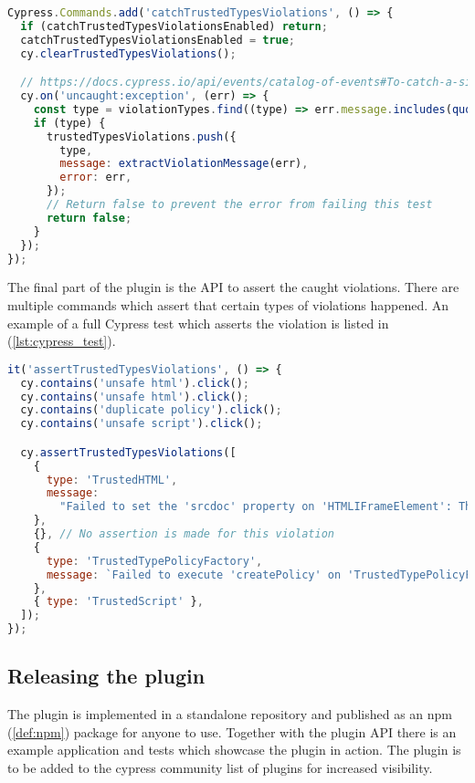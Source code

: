 \bigskip
\begin{lstlisting}[language=JavaScript, caption=Custom command to catch Trusted Types violations]
Cypress.Commands.add('catchTrustedTypesViolations', () => {
  if (catchTrustedTypesViolationsEnabled) return;
  catchTrustedTypesViolationsEnabled = true;
  cy.clearTrustedTypesViolations();

  // https://docs.cypress.io/api/events/catalog-of-events#To-catch-a-single-uncaught-exception
  cy.on('uncaught:exception', (err) => {
    const type = violationTypes.find((type) => err.message.includes(quote(type)));
    if (type) {
      trustedTypesViolations.push({
        type,
        message: extractViolationMessage(err),
        error: err,
      });
      // Return false to prevent the error from failing this test
      return false;
    }
  });
});
\end{lstlisting}

The final part of the plugin is the API to assert the caught violations. There are multiple commands
which assert that certain types of violations happened. An example of a full Cypress test which
asserts the violation is listed in (\ref{lst:cypress_test}).

\bigskip
\begin{lstlisting}[language=JavaScript, caption=Example Trusted Types violation test, label={lst:cypress_test}]
it('assertTrustedTypesViolations', () => {
  cy.contains('unsafe html').click();
  cy.contains('unsafe html').click();
  cy.contains('duplicate policy').click();
  cy.contains('unsafe script').click();

  cy.assertTrustedTypesViolations([
    {
      type: 'TrustedHTML',
      message:
        "Failed to set the 'srcdoc' property on 'HTMLIFrameElement': This document requires 'TrustedHTML' assignment.",
    },
    {}, // No assertion is made for this violation
    {
      type: 'TrustedTypePolicyFactory',
      message: `Failed to execute 'createPolicy' on 'TrustedTypePolicyFactory': Policy with name "my-policy" already exists.`,
    },
    { type: 'TrustedScript' },
  ]);
});
\end{lstlisting}

\subsection{Releasing the plugin}

The plugin is implemented in a standalone repository \cite{cypress-trusted-types:github} and
published as an npm (\ref{def:npm}) package \cite{cypress-trusted-types:npm} for anyone to use.
Together with the plugin API there is an example application and tests which showcase the plugin in
action. The plugin is to be added to the cypress community list of plugins for increased visibility.
